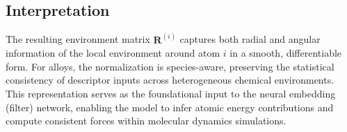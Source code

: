 \documentclass[12pt,a4paper]{article}
\begin{document}
\subsection*{Interpretation}

The resulting environment matrix $\mathbf{R}^{(i)}$ captures both radial and angular information of the local environment around atom $i$ in a smooth, differentiable form.  
For alloys, the normalization is species-aware, preserving the statistical consistency of descriptor inputs across heterogeneous chemical environments.  
This representation serves as the foundational input to the neural embedding (filter) network, enabling the model to infer atomic energy contributions and compute consistent forces within molecular dynamics simulations.
\end{document}

